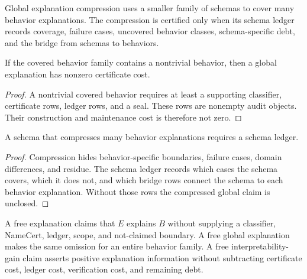 \begin{definition}
\label{def:philosophy-global-explanation-compression}
Global explanation compression uses a smaller family of schemas to cover
many behavior explanations. The compression is certified only when its
schema ledger records coverage, failure cases, uncovered behavior
classes, schema-specific debt, and the bridge from schemas to behaviors.
\end{definition}

\begin{theorem}
\label{thm:philosophy-global-explanation-nonzero-cost}
If the covered behavior family contains a nontrivial behavior, then a
global explanation has nonzero certificate cost.
\end{theorem}
\begin{proof}
A nontrivial covered behavior requires at least a supporting classifier,
certificate rows, ledger rows, and a seal. These rows are nonempty
audit objects. Their construction and maintenance cost is therefore not
zero.
\end{proof}

\begin{theorem}
\label{thm:philosophy-compressed-global-explanations-require-schema-ledgers}
A schema that compresses many behavior explanations requires a schema
ledger.
\end{theorem}
\begin{proof}
Compression hides behavior-specific boundaries, failure cases, domain
differences, and residue. The schema ledger records which cases the
schema covers, which it does not, and which bridge rows connect the
schema to each behavior explanation. Without those rows the compressed
global claim is unclosed.
\end{proof}

\begin{definition}
\label{def:philosophy-free-explanation-free-gain}
A free explanation claims that $E$ explains $B$ without supplying a
classifier, NameCert, ledger, scope, and not-claimed boundary. A free
global explanation makes the same omission for an entire behavior
family. A free interpretability-gain claim asserts positive explanation
information without subtracting certificate cost, ledger cost,
verification cost, and remaining debt.
\end{definition}

